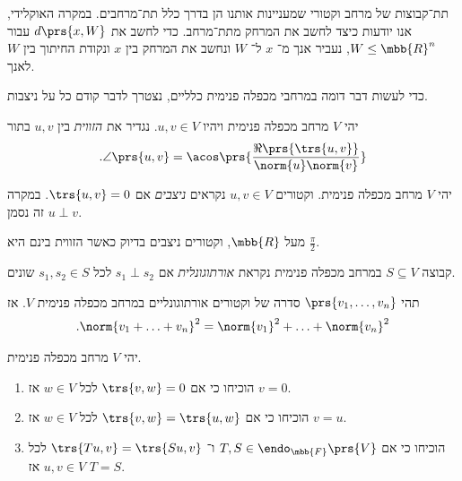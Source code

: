 \documentclass[a4paper,10pt,twoside,openany]{book}
\begin{document}
תת־קבוצות של מרחב וקטורי שמעניינות אותנו הן בדרך כלל תת־מרחבים. במקרה האוקלידי, אנו יודעות כיצד לחשב את המרחק מתת־מרחב. כדי לחשב את
$d\prs{x,W}$
עבור
$W \leq \mbb{R}^n$,
נעביר אנך מ־%
$x$
ל־%
$W$
ונחשב את המרחק בין
$x$
ונקודת החיתוך בין
$W$
לאנך.

כדי לעשות דבר דומה במרחבי מכפלה פנימית כלליים, נצטרך לדבר קודם כל על ניצבות.

\begin{definition}
יהי
$V$
מרחב מכפלה פנימית ויהיו
$u,v \in V$.
נגדיר את
\emph{הזווית}
בין
$u,v$
בתור
\[\text{.} \angle\prs{u,v} = \acos\prs{{\frac{\Re\prs{\trs{u,v}}}{\norm{u} \norm{v}}}}\]
\end{definition}

\begin{definition}
יהי
$V$
מרחב מכפלה פנימית.
וקטורים
$u,v \in V$
נקראים
\emph{ניצבים}
אם
$\trs{u,v} = 0$.
במקרה זה נסמן
$u \perp v$.
\end{definition}

\begin{remark}
מעל
$\mbb{R}$,
וקטורים ניצבים בדיוק כאשר הזווית בינם היא
$\frac{\pi}{2}$.
\end{remark}

\begin{definition}
קבוצה
$S \subseteq V$
במרחב מכפלה פנימית נקראת
\emph{אורתוגונלית}
אם
$s_1 \perp s_2$
לכל
$s_1, s_2 \in S$
שונים.
\end{definition}

\begin{theorem}[פיתגורס]
תהי
$\prs{v_1, \ldots, v_n}$
סדרה של וקטורים אורתוגונליים במרחב מכפלה פנימית
$V$.
אז
\begin{align*}
\text{.} \norm{v_1 + \ldots + v_n}^2 = \norm{v_1}^2 + \ldots + \norm{v_n}^2
\end{align*}
\end{theorem}

\begin{exercisechap}
יהי
$V$
מרחב מכפלה פנימית.
\begin{enumerate}
\item הוכיחו כי אם
$\trs{v,w} = 0$
לכל
$w \in V$
אז
$v = 0$.
\item הוכיחו כי אם
$\trs{v,w} = \trs{u,w}$
לכל
$w \in V$
אז
$v=u$.
\item הוכיחו כי אם
$T,S \in \endo_{\mbb{F}}\prs{V}$
ו־%
$\trs{Tu,v} = \trs{Su,v}$
לכל
$u,v \in V$
אז
$T = S$.
\end{enumerate}
\end{exercisechap}
\end{document}
